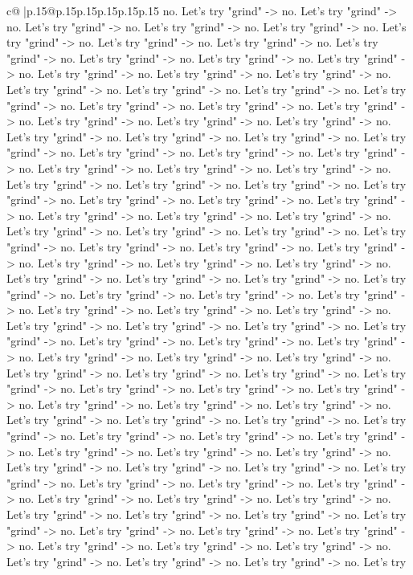 \documentclass{article}
\begin{document}
{\begin{supertabular}{c@{$\;$}|p{.15\linewidth}@{}p{.15\linewidth}p{.15\linewidth}p{.15\linewidth}p{.15\linewidth}p{.15\linewidth}}
{{{no. Let's try "grind" {-}> no. Let's try "grind" {-}> no. Let's try "grind" {-}> no. Let's try "grind" {-}> no. Let's try "grind" {-}> no. Let's try "grind" {-}> no. Let's try "grind" {-}> no. Let's try "grind" {-}> no. Let's try "grind" {-}> no. Let's try "grind" {-}> no. Let's try "grind" {-}> no. Let's try "grind" {-}> no. Let's try "grind" {-}> no. Let's try "grind" {-}> no. Let's try "grind" {-}> no. Let's try "grind" {-}> no. Let's try "grind" {-}> no. Let's try "grind" {-}> no. Let's try "grind" {-}> no. Let's try "grind" {-}> no. Let's try "grind" {-}> no. Let's try "grind" {-}> no. Let's try "grind" {-}> no. Let's try "grind" {-}> no. Let's try "grind" {-}> no. Let's try "grind" {-}> no. Let's try "grind" {-}> no. Let's try "grind" {-}> no. Let's try "grind" {-}> no. Let's try "grind" {-}> no. Let's try "grind" {-}> no. Let's try "grind" {-}> no. Let's try "grind" {-}> no. Let's try "grind" {-}> no. Let's try "grind" {-}> no. Let's try "grind" {-}> no. Let's try "grind" {-}> no. Let's try "grind" {-}> no. Let's try "grind" {-}> no. Let's try "grind" {-}> no. Let's try "grind" {-}> no. Let's try "grind" {-}> no. Let's try "grind" {-}> no. Let's try "grind" {-}> no. Let's try "grind" {-}> no. Let's try "grind" {-}> no. Let's try "grind" {-}> no. Let's try "grind" {-}> no. Let's try "grind" {-}> no. Let's try "grind" {-}> no. Let's try "grind" {-}> no. Let's try "grind" {-}> no. Let's try "grind" {-}> no. Let's try "grind" {-}> no. Let's try "grind" {-}> no. Let's try "grind" {-}> no. Let's try "grind" {-}> no. Let's try "grind" {-}> no. Let's try "grind" {-}> no. Let's try "grind" {-}> no. Let's try "grind" {-}> no. Let's try "grind" {-}> no. Let's try "grind" {-}> no. Let's try "grind" {-}> no. Let's try "grind" {-}> no. Let's try "grind" {-}> no. Let's try "grind" {-}> no. Let's try "grind" {-}> no. Let's try "grind" {-}> no. Let's try "grind" {-}> no. Let's try "grind" {-}> no. Let's try "grind" {-}> no. Let's try "grind" {-}> no. Let's try "grind" {-}> no. Let's try "grind" {-}> no. Let's try "grind" {-}> no. Let's try "grind" {-}> no. Let's try "grind" {-}> no. Let's try "grind" {-}> no. Let's try "grind" {-}> no. Let's try "grind" {-}> no. Let's try "grind" {-}> no. Let's try "grind" {-}> no. Let's try "grind" {-}> no. Let's try "grind" {-}> no. Let's try "grind" {-}> no. Let's try "grind" {-}> no. Let's try "grind" {-}> no. Let's try "grind" {-}> no. Let's try "grind" {-}> no. Let's try "grind" {-}> no. Let's try "grind" {-}> no. Let's try "grind" {-}> no. Let's try "grind" {-}> no. Let's try "grind" {-}> no. Let's try "grind" {-}> no. Let's try "grind" {-}> no. Let's try "grind" {-}> no. Let's try "grind" {-}> no. Let's try "grind" {-}> no. Let's try "grind" {-}> no. Let's try "grind" {-}> no. Let's try "grind" {-}> no. Let's try "grind" {-}> no. Let's try "grind" {-}> no. Let's try "grind" {-}> no. Let's try "grind" {-}> no. Let's try "grind" {-}> no. Let's try "grind" {-}> no. Let's try "grind" {-}> no. Let's try "grind" {-}> no. Let's try "grind" {-}> no. Let's try "grind" {-}> no. Let's try "grind" {-}> no. Let's try "grind" {-}> no. Let's try "grind" {-}> no. Let's try "grind" {-}> no. Let's try "grind" {-}> no. Let's try }}}
\end{supertabular}}
\end{document}
